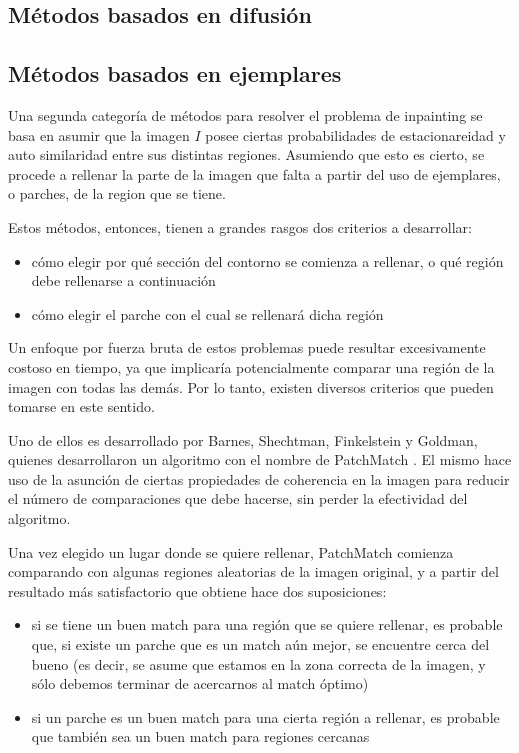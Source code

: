 \documentclass[assd_tpf_main.tex]{subfiles}
\begin{document}
\subsection{Métodos basados en difusión}


\subsection{Métodos basados en ejemplares}
Una segunda categor\'ia de m\'etodos para resolver el problema de inpainting se basa en 
asumir que la imagen $I$ posee ciertas probabilidades de estacionareidad y auto similaridad 
entre sus distintas regiones. Asumiendo que esto es cierto, se procede a rellenar la parte
de la imagen que falta a partir del uso de ejemplares, o parches, de la region que se tiene.

Estos m\'etodos, entonces, tienen a grandes rasgos dos criterios a desarrollar:
\begin{itemize}
	\item c\'omo elegir por qu\'e secci\'on del contorno se comienza a rellenar, o qu\'e
	regi\'on debe rellenarse a continuaci\'on
	\item c\'omo elegir el parche con el cual se rellenar\'a dicha regi\'on
\end{itemize}

Un enfoque por fuerza bruta de estos problemas puede resultar excesivamente costoso en tiempo, ya que implicar\'ia potencialmente comparar una regi\'on de la imagen con todas las dem\'as. Por lo tanto, existen diversos criterios que pueden tomarse en este sentido.

Uno de ellos es desarrollado por Barnes, Shechtman, Finkelstein y Goldman, quienes desarrollaron un algoritmo con el nombre de PatchMatch \cite{patchmatch}.  El mismo
hace uso de la asunci\'on de ciertas propiedades de coherencia en la imagen para reducir
el n\'umero de comparaciones que debe hacerse, sin perder la efectividad del algoritmo.
 
Una vez elegido un lugar donde se quiere rellenar, PatchMatch comienza comparando con algunas regiones aleatorias de la imagen original, y a partir del resultado m\'as satisfactorio que obtiene hace dos suposiciones:
\begin{itemize}
	\item si se tiene un buen match para una regi\'on que se quiere rellenar, es probable 
	que, si existe un parche que es un match a\'un mejor, se encuentre cerca del bueno (es
	decir, se asume que estamos en la zona correcta de la imagen, y s\'olo debemos
	terminar de acercarnos al match \'optimo)
	\item si un parche es un buen match para una cierta regi\'on a rellenar, es probable que
	tambi\'en sea un buen match para regiones cercanas
\end{itemize}
\end{document}
